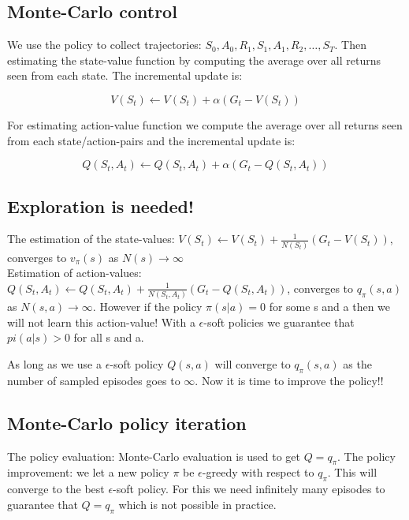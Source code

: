 \subsection*{Monte-Carlo control}
We use the policy to collect trajectories: $S_0,A_0,R_1,S_1,A_1,R_2,\ldots,S_T$. Then estimating the state-value function by computing the average over all returns seen from each state. The incremental update is:

	\begin{equation}
		V(S_t) \leftarrow V(S_t) + \alpha(G_t - V(S_t))
	\end{equation}

For estimating action-value function we compute the average over all returns seen from each state/action-pairs and the incremental update is:

	\begin{equation}
		Q(S_t,A_t) \leftarrow Q(S_t,A_t) + \alpha(G_t - Q(S_t,A_t))
	\end{equation}

\subsection*{Exploration is needed!}
The estimation of the state-values: $V(S_t) \leftarrow V(S_t) + \frac{1} {N(S_t)}(G_t - V(S_t))$, converges to $v_\pi(s)$ as $N(s) \rightarrow \infty$ \\
Estimation of action-values: $Q(S_t,A_t) \leftarrow Q(S_t,A_t) + \frac{1} {N(S_t,A_t)}(G_t - Q(S_t,A_t)) $, converges to $q_\pi(s,a)$ as $N(s,a) \rightarrow \infty$. However if the policy $\pi (s|a) = 0$ for some s and a then we will not learn this action-value! With a $\epsilon$-soft policies we guarantee that $pi (a|s) > 0$ for all s and a.

As long as we use a $\epsilon$-soft policy $Q(s,a)$ will converge to $q_\pi(s,a)$ as the number of sampled episodes goes to $\infty$. Now it is time to improve the policy!!

\subsection*{Monte-Carlo policy iteration}
The policy evaluation: Monte-Carlo evaluation is used to get $Q = q_\pi$. The policy improvement: we let a new policy $\pi$ be $\epsilon$-greedy with respect to $q_\pi$. This will converge to the best $\epsilon$-soft policy. For this we need infinitely many episodes to guarantee that $Q = q_\pi$ which is not possible in practice. 

